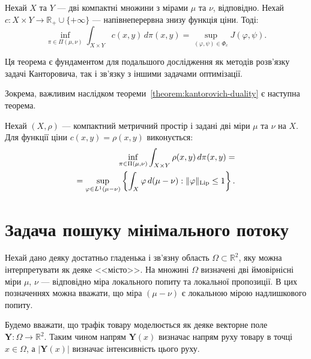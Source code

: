 \begin{theorem}
    \label{theorem:kantorovich-duality}
    Нехай $X$ та $Y$ --- дві компактні множини з мірами $\mu$ та $\nu$, відповідно. 
    Нехай $c : X \times Y \to \mathbb{R}_+ \cup \{+\infty\}$ --- напівнеперервна знизу функція ціни. Тоді:
    $$
        \inf_{\pi \in \Pi(\mu, \nu)} \int_{X \times Y} c(x, y)\, d\pi(x, y) = \sup_{(\varphi, \psi) \in \Phi_c} J(\varphi, \psi).
    $$
\end{theorem}

Ця теорема є фундаментом для подальшого дослідження як методів розв'язку задачі Канторовича,
так і зв'язку з іншими задачами оптимізації. 

Зокрема, важливим наслідком теореми~\ref{theorem:kantorovich-duality} є наступна теорема.

\begin{theorem}
    \label{theorem:kr-duality}
    Нехай $(X, \rho)$ --- компактний метричний простір і задані дві міри $\mu$ та $\nu$ на $X$.
    Для функції ціни $c(x, y) = \rho(x, y)$ виконується:
    \begin{equation}
        \begin{aligned}
            \label{eq:kr-duality}
            \inf_{\pi \in \Pi(\mu, \nu)} \int_{X \times Y} \rho(x, y)\, d\pi(x, y) = \\
            = \sup_{\varphi \in L^1(\mu - \nu)} 
            \left\{
                \int_X \varphi\, d(\mu - \nu) : \|\varphi\|_{\text{Lip}} \le 1
            \right\}.
        \end{aligned}
    \end{equation}
\end{theorem}

\section{Задача пошуку мінімального потоку}
\label{sec:min-flow-problem}

Нехай дано деяку достатньо гладенька і зв'язну область $\Omega \subset \mathbb{R}^2$,
яку можна інтерпретувати як деяке <<місто>>.
На множині $\Omega$ визначені дві ймовірнісні міри $\mu$, $\nu$ --- відповідно міра локального попиту 
та локальної пропозиції.
В цих позначеннях можна вважати, що міра $(\mu - \nu)$ є локальною мірою надлишкового попиту.

Будемо вважати, що трафік товару моделюється як деяке векторне поле $\mathbf{Y} : \Omega \to \mathbb{R}^2$. 
Таким чином напрям $\mathbf Y(x)$ визначає напрям руху товару в точці $x \in \Omega$,
а $\left|\mathbf{Y}(x)\right|$ визначає інтенсивність цього руху.

